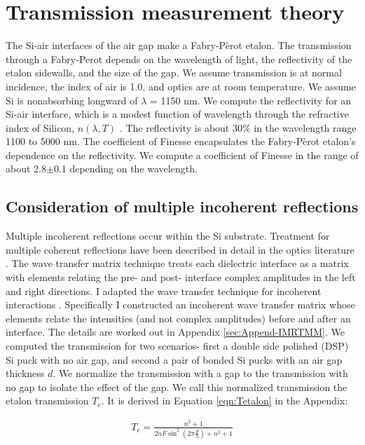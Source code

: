 \documentclass[osajnl,preprint,showpacs,superscriptaddress,12pt]{revtex4-1} %
\begin{document}
\section{Transmission measurement theory}
The Si-air interfaces of the air gap make a Fabry-P\`erot etalon\cite{2007fuph.book.....S}.  The transmission through a Fabry-Perot depends on the wavelength of light, the reflectivity of the etalon sidewalls, and the size of the gap.  We assume transmission is at normal incidence, the index of air is 1.0, and optics are at room temperature.  We assume Si is nonabsorbing longward of $\lambda$ = 1150 nm.  We compute the reflectivity for an Si-air interface, which is a modest function of wavelength through the refractive index of Silicon, $n(\lambda, T)$ \cite{2006SPIE.6273E..77F}.  The reflectivity is about 30\% in the wavelength range 1100 to 5000 nm.  The coefficient of Finesse\cite{2007fuph.book.....S} encapsulates the Fabry-P\`erot etalon's dependence on the reflectivity.  We compute a coefficient of Finesse in the range of about 2.8$\pm$0.1 depending on the wavelength.

\subsection{Consideration of multiple incoherent reflections}
Multiple incoherent reflections occur within the Si substrate.  Treatment for multiple coherent reflections have been described in detail in the optics literature \cite{2007fuph.book.....S}.  The wave transfer matrix technique treats each dielectric interface as a matrix with elements relating the pre- and post- interface complex amplitudes in the left and right directions.  I adapted the wave transfer technique for incoherent interactions \cite{2002ApOpt..41.3978K}.  Specifically I constructed an incoherent wave transfer matrix whose elements relate the intensities (and not complex amplitudes) before and after an interface.  The details are worked out in Appendix \ref{sec:Append-IMRTMM}.  We computed the transmission for two scenarios- first a double side polished (DSP) Si puck with no air gap, and second a pair of bonded Si pucks with an air gap thickness $d$.  We normalize the transmission with a gap to the transmission with no gap to isolate the effect of the gap.  We call this normalized transmission the etalon transmission $T_{e}$.  It is derived in Equation \ref{eqn:Tetalon} in the Appendix:

\begin{eqnarray}
T_{e} = \frac{n^2+1}{2 n F \sin ^2(2\pi \frac{d}{\lambda})+n^2+1} \nonumber
\end{eqnarray}
\end{document}
